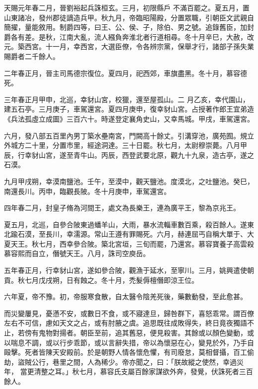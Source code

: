 \begin{pinyinscope}
 天賜元年春二月，晉劉裕起兵誅桓玄。三月，初限縣戶
 不滿百罷之。夏五月，置山東諸冶，發州郡徒謫造兵甲。秋九月，帝臨昭陽殿，分置眾職，引朝臣文武親自簡擢，量能敘用。制爵四等，曰王、公、侯、子，除伯、男之號。追錄舊臣，加封爵各有差。是秋，江南大亂，流人繦負奔淮北者行道相尋。冬十月辛巳，大赦，改元。築西宮。十一月，幸西宮，大選臣僚，令各辨宗黨，保舉才行，諸部子孫失業賜爵者二千餘人。



 二年春正月，晉主司馬德宗復位。夏四月，祀西郊，車旗盡黑。冬十月，慕容德死。



 三年春正月甲申，北巡，幸豺山宮，校獵，還至屋孤山。二
 月乙亥，幸代園山，建五石亭。三月庚子，車駕還宮。夏四月庚申，復幸豺山宮。占授著作郎王宜弟造《兵法孤虛立成圖》三百六十。時遂登定襄角史山，又幸馬城。甲戌，車駕還宮。



 六月，發八部五百里內男丁築水壘南宮，門闕高十餘丈。引溝穿池，廣苑囿。規立外城方二十里，分置市里，經途洞達。三十日罷。秋七月，太尉穆崇薨。八月甲辰，行幸豺山宮，遂至青牛山。丙辰，西登武要北原，觀九十九泉，造古亭，遂之石漠。



 九月甲戌朔，幸漠南鹽池。壬午，至漠中，觀天鹽池。度漠北，之吐鹽池。癸巳，南還長川。丙申，臨觀長陂。冬十月庚申，車駕還宮。



 四年春二月，封皇子脩為河間王，處文為長樂王，連為廣平王，黎為京兆王。



 夏五月，北巡，自參合陂東過蟠羊山，大雨，暴水流輜車數百乘，殺百餘人。遂東北踰石漠，至長川，幸濡源。常山王遵有罪賜死。六月，赫連屈丐自稱大單于、大夏天王。秋七月，西幸參合陂。築北宮垣，三旬而罷，乃還宮。慕容寶養子高雲殺慕容熙而自立，僭號天王。八月，誅司空庾岳。



 五年春正月，行幸豺山宮，遂如參合陂，觀漁于延水，至寧川。三月，姚興遣使朝貢。秋七月戊戌朔，日有蝕之。冬十月，禿髮傉檀僭即涼王位。



 六年夏，帝不豫。初，帝服寒食散，自太醫令陰羌死後，藥數動發，至此愈甚。



 而災變屢見，憂懣不安，或數日不食，或不寢達旦，歸咎群下，喜怒乖常。謂百僚左右不可信，慮如天文之占，或有肘腋之虞。追思既往成敗得失，終日竟夜獨語不止，若傍有鬼物對揚者。朝臣至前，追其舊惡，便見殺害。其餘或以顏色變動，或以喘息不調，或以行步乖節，或以言辭失措，帝以為懷惡在心，變見於外，乃手自毆擊。死者皆陳天安殿前。於是朝野人情各懷危懼，有司廢怠，莫相督攝，百工偷劫，盜賊公行，巷里之間，人為稀少。帝亦聞之，曰：「朕故縱之使然，幸過災年，
 當更清整之耳。」秋七月，慕容氏支屬百餘家謀欲外奔，發覺，伏誅死者三百餘人。




\end{pinyinscope}
